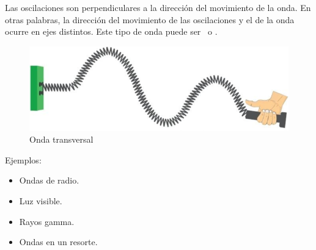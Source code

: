 Las oscilaciones son perpendiculares a la dirección del movimiento de la onda. En otras palabras, la dirección del movimiento de las oscilaciones y el de la onda ocurre en ejes distintos. Este tipo de onda puede ser \mecanica\ o \electromagnetica.

\begin{figure}[H]
  \centering
  \includegraphics[scale=0.4]{imagenes/onda_transversal.png}
  \caption{Onda transversal\cite{educacao}}
\end{figure}

Ejemplos:

\begin{itemize}
  \item Ondas de radio.
  \item Luz visible.
  \item Rayos gamma.
  \item Ondas en un resorte.
\end{itemize}
